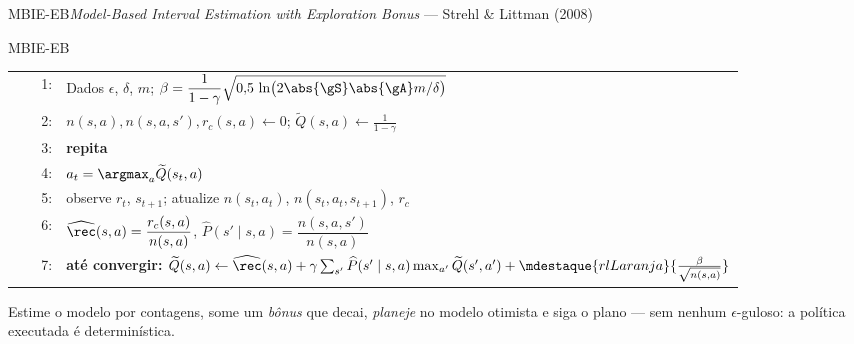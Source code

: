 \documentclass[aspectratio=169, 11pt]{beamer}
\makeatletter
\newcommand{\Qtil}{\widetilde{Q}}
\newcommand{\Rhat}{\widehat{\rec}}
\newcommand{\That}{\widehat{P}}
\newenvironment{pseudo}[1][0.93\linewidth]{%
  \small\setlength{\tabcolsep}{0pt}%
  \begin{tabular}{@{}r@{\hspace{0.55em}}p{#1}@{}}}%
  {\end{tabular}}
\newcommand{\pln}[1]{{\scriptsize\color{rlCinza}#1:}}
\newcommand{\ind}{\hspace*{1.1em}}
\makeatother
\begin{document}
\begin{frame}{MBIE-EB}{\textit{Model-Based Interval Estimation with Exploration Bonus} --- Strehl \& Littman (2008)}
  \vspace{-0.3em}
  \begin{algbox}{MBIE-EB}
    \begin{pseudo}
      \pln{1}  & Dados $\epsilon$, $\delta$, $m$; \quad
                 $\beta = \dfrac{1}{1-\gamma}\sqrt{0{,}5\,\ln\bigl(2\abs{\gS}\abs{\gA}m/\delta\bigr)}$ \\[0.3em]
      \pln{2}  & $n(s,a), n(s,a,s'), r_c(s,a) \gets 0$; \quad
                 $\Qtil(s,a) \gets \tfrac{1}{1-\gamma}$ \\[0.2em]
      \pln{3}  & \textbf{repita} \\
      \pln{4}  & \ind $a_t = \argmax_{a} \Qtil(s_t, a)$ \quad {\scriptsize\color{rlCinza}(guloso na $Q$ \emph{otimista})} \\
      \pln{5}  & \ind observe $r_t$, $s_{t+1}$; atualize $n(s_t,a_t)$, $n(s_t,a_t,s_{t+1})$, $r_c$ \\[0.15em]
      \pln{6}  & \ind $\Rhat(s,a) = \dfrac{r_c(s,a)}{n(s,a)}$, \quad
                 $\That(s'\mid s,a) = \dfrac{n(s,a,s')}{n(s,a)}$ \\[0.35em]
      \pln{7}  & \ind \textbf{até convergir:}\quad
                 $\Qtil(s,a) \gets \Rhat(s,a)
                 + \gamma \sum_{s'} \That(s'\mid s,a)\max_{a'}\Qtil(s',a')
                 + \mdestaque{rlLaranja}{\frac{\beta}{\sqrt{n(s,a)}}}$
    \end{pseudo}
  \end{algbox}
  \vspace{-0.4em}
  {\small\color{rlCinza} Estime o modelo por contagens, some um \emph{bônus} que decai,
  \emph{planeje} no modelo otimista e siga o plano --- sem nenhum $\epsilon$-guloso: a
  política executada é determinística.}
\end{frame}
\end{document}

